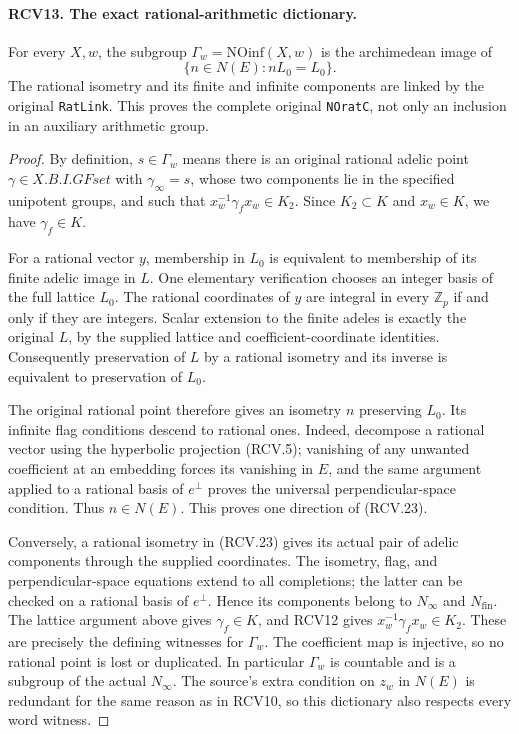 \documentclass[11pt,a4paper]{article}
\numberwithin{equation}{section}
\theoremstyle{remark}\newtheorem{remark}[theorem]{Remark}
\begin{document}
\paragraph{RCV13. The exact rational-arithmetic dictionary.}
\label{claim:RCV13}
For every \(X,w\), the subgroup \(\Gamma_w=\mathrm{NOinf}(X,w)\)
is the archimedean image of
\[
            \{n\in N(E):nL_0=L_0\}.
\tag{RCV.23}
\]
The rational isometry and its finite and infinite components are
linked by the original \texttt{Rat\allowbreak Link}.  This proves the complete
original \texttt{NOrat\allowbreak C}, not only an inclusion in an auxiliary
arithmetic group.
\begin{proof}
By definition, \(s\in\Gamma_w\) means there is an original
rational adelic point \(\gamma\in X.B.I.GFset\) with
\(\gamma_\infty=s\), whose two components lie in the specified
unipotent groups, and such that
\(x_w^{-1}\gamma_f x_w\in K_2\).  Since \(K_2\subset K\)
and \(x_w\in K\), we have \(\gamma_f\in K\).

For a rational vector \(y\), membership in \(L_0\) is equivalent
to membership of its finite adelic image in \(L\).  One elementary
verification chooses an integer basis of the full lattice \(L_0\).
The rational coordinates of \(y\) are integral in every \(\mathbb Z_p\)
if and only if they are integers.  Scalar extension to the finite
adeles is exactly the original \(L\), by the supplied lattice
and coefficient-coordinate identities.  Consequently preservation of
\(L\) by a rational isometry and its inverse is equivalent to
preservation of \(L_0\).

The original rational point therefore gives an isometry \(n\)
preserving \(L_0\).  Its infinite flag conditions descend to
rational ones.  Indeed, decompose a rational vector using the
hyperbolic projection (RCV.5); vanishing of any unwanted coefficient
at an embedding forces its vanishing in \(E\), and the same
argument applied to a rational basis of \(e^\perp\) proves
the universal perpendicular-space condition.  Thus \(n\in N(E)\).
This proves one direction of (RCV.23).

Conversely, a rational isometry in (RCV.23) gives its actual pair of
adelic components through the supplied coordinates.  The isometry,
flag, and perpendicular-space equations extend to all completions;
the latter can be checked on a rational basis of \(e^\perp\).
Hence its components belong to \(N_\infty\) and \(N_{\mathrm{fin}}\).
The lattice argument above gives \(\gamma_f\in K\), and RCV12
gives \(x_w^{-1}\gamma_f x_w\in K_2\).  These are precisely
the defining witnesses for \(\Gamma_w\).  The coefficient map
is injective, so no rational point is lost or duplicated.
In particular \(\Gamma_w\) is countable and is a subgroup of
the actual \(N_\infty\).  The source's extra condition on
\(z_w\) in \(N(E)\) is redundant for the same reason as in
RCV10, so this dictionary also respects every word witness.
\end{proof}
\end{document}
